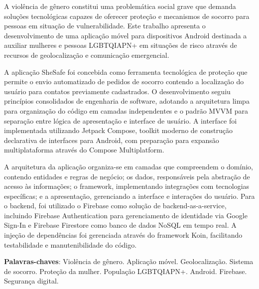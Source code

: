 \documentclass[
	12pt,				    %
	openright,			    %
	oneside,			    %
	a4paper,			    %
    sumario=tradicional,    %
	english,			    %
	brazil,				    %
	]{abntex2}              %
\begin{document}
\begin{resumo}
 \noindent
 A violência de gênero constitui uma problemática social grave que demanda soluções tecnológicas capazes de oferecer proteção e mecanismos de socorro para pessoas em situação de vulnerabilidade. Este trabalho apresenta o desenvolvimento de uma aplicação móvel para dispositivos Android destinada a auxiliar mulheres e pessoas LGBTQIAPN+ em situações de risco através de recursos de geolocalização e comunicação emergencial.
 
 A aplicação SheSafe foi concebida como ferramenta tecnológica de proteção que permite o envio automatizado de pedidos de socorro contendo a localização do usuário para contatos previamente cadastrados. O desenvolvimento seguiu princípios consolidados de engenharia de software, adotando a arquitetura limpa para organização do código em camadas independentes e o padrão MVVM para separação entre lógica de apresentação e interface de usuário. A interface foi implementada utilizando Jetpack Compose, toolkit moderno de construção declarativa de interfaces para Android, com preparação para expansão multiplataforma através do Compose Multiplatform.
 
 A arquitetura da aplicação organiza-se em camadas que compreendem o domínio, contendo entidades e regras de negócio; os dados, responsáveis pela abstração de acesso às informações; o framework, implementando integrações com tecnologias específicas; e a apresentação, gerenciando a interface e interações do usuário. Para o backend, foi utilizado o Firebase como solução de backend-as-a-service, incluindo Firebase Authentication para gerenciamento de identidade via Google Sign-In e Firebase Firestore como banco de dados NoSQL em tempo real. A injeção de dependências foi gerenciada através do framework Koin, facilitando testabilidade e manutenibilidade do código.
\begin{comment}
	Objetivo: Desenvolver uma aplicação móvel denominada "SheSafe" para envio automatizado de pedidos de socorro com coordenadas de geolocalização em tempo real, direcionada prioritariamente a mulheres vítimas de violência doméstica e de gênero, mas extensível a todas as pessoas em situação de vulnerabilidade, incluindo a população LGBTQIAPN+.
\end{comment}


 \vspace{\onelineskip}

 \noindent
 \textbf{Palavras-chaves}: Violência de gênero. Aplicação móvel. Geolocalização. Sistema de socorro. Proteção da mulher. População LGBTQIAPN+. Android. Firebase. Segurança digital.
\end{resumo}
\end{document}
